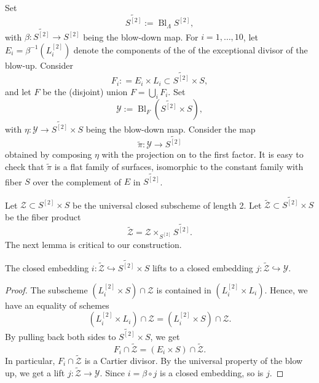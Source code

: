\documentclass[reqno]{amsart}
\DeclareMathOperator{\Bl}{Bl}
\renewcommand{\to}{{\longrightarrow}}
\numberwithin{equation}{section}
\begin{document}
Set
\begin{equation}
  \label{eq:S2tilde}
  \widetilde {S^{[2]}} := \Bl_{\Lambda}S^{[2]},
\end{equation}
with $\beta \colon \widetilde {S^{[2]}} \to S^{[2]}$ being the blow-down map.
For $i=1, \dots, 10$, let $E_{i} = \beta^{-1}(L^{[2]}_{i})$ denote the
components of the of the exceptional divisor of the blow-up.
Consider
\[ F_i: = E_i \times L_i \subset \widetilde {S^{[2]}} \times S,\]
and let $F$ be the (disjoint) union $F = \bigcup_i F_i$.
Set
\begin{equation}
  \label{eq:Xtilde}
  \mathcal{Y} := \Bl_{F}\left( \widetilde{S^{[2]}} \times S \right),
\end{equation}
with $\eta \colon \mathcal{Y} \to  \widetilde{S^{[2]}} \times S$ being the blow-down map.
Consider the map
\[ \widetilde{\pi} \colon \mathcal{Y} \to \widetilde {S^{[2]}}\]
obtained by composing $\eta$ with the projection on to the first factor.
It is easy to check that $\widetilde{\pi}$ is a flat family of surfaces, isomorphic to the constant family with fiber $S$ over the complement of $E$ in $\widetilde{S^{[2]}}$.

Let $\mathcal{Z} \subset S^{[2]} \times S$ be the universal closed subscheme of length 2.
Let $\widetilde {\mathcal{Z}} \subset \widetilde{S^{[2]}} \times S$ be the fiber product
\[ \widetilde {\mathcal{Z}} = \mathcal{Z} \times_{S^{[2]}} \widetilde {S^{[2]}}.\]
The next lemma is critical to our construction.
\begin{lemma}
  The closed embedding
  $i: \widetilde{\mathcal{Z}} \hookrightarrow \widetilde{S^{[2]}}
  \times S$ lifts to a closed embedding
  $j: \widetilde{\mathcal{Z}} \hookrightarrow  \mathcal{Y}$.
\end{lemma}
\begin{proof}
  The subscheme $(L^{[2]}_i \times S) \cap \mathcal{Z}$ is contained in $(L^{[2]}_i \times L_i)$.
  Hence, we have an equality of schemes
  \[
    (L^{[2]}_i \times L_i) \cap \mathcal{Z} = (L^{[2]}_i \times S) \cap \mathcal{Z}.
  \]
  By pulling back both sides to $\widetilde{S^{[2]}} \times S$, we get
  \begin{equation}
    \label{eq:Cartier}
    F_i \cap \widetilde{\mathcal{Z}} = (E_i \times S) \cap \widetilde{\mathcal{Z}}.
  \end{equation}
  In particular, $F_i \cap \widetilde {\mathcal{Z}}$ is a Cartier divisor.
  By the universal property of the blow up, we get a lift $j \colon \widetilde{\mathcal{Z}} \to \mathcal{Y}$.
  Since $i = \beta \circ j$ is a closed embedding, so is $j$.
\end{proof}
\end{document}
